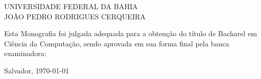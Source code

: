 \begin{folhadeaprovacao}


\begin{center}


            {UNIVERSIDADE FEDERAL DA BAHIA} \\
           

    \vspace{1.5cm}
                                    {JOÃO PEDRO RODRIGUES CERQUEIRA}\\
    \bfseries{}
\end{center}

Esta Monografia foi julgada adequada para a obten\c{c}\~{a}o do título  de Bacharel em Ciência da Computação, sendo aprovada em sua forma final  pela banca examinadora:

    \vspace{3cm}
    
    \vspace{3 cm}%

    \begin{center}
        Salvador, \today
    \end{center}
  
\end{folhadeaprovacao}